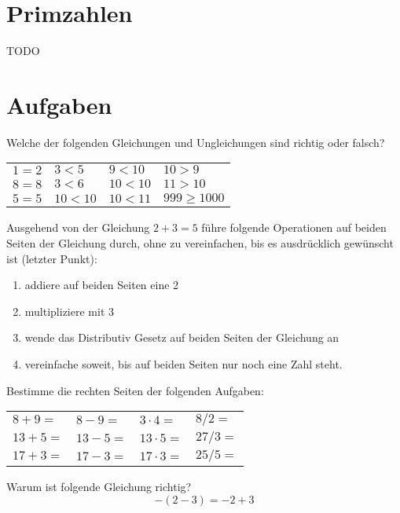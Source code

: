 \section{Primzahlen}

TODO

\section{Aufgaben}

\begin{prob}
\label{arith.1.1}

Welche der folgenden Gleichungen und Ungleichungen sind richtig oder falsch?
\begin{center}
\begin{tabular}{C{2cm}C{2cm}C{2cm}C{2cm}}
$1=2$ & $3<5$ & $9<10$ & $10>9$ \\
$8=8$ & $3<6$ & $10<10$ & $11>10$ \\
$5=5$ & $10<10$ & $10<11$ & $999 \ge 1000$ 
\end{tabular}
\end{center}
\end{prob}

\begin{prob}
\label{arith.1.2}
Ausgehend von der Gleichung $2+3=5$ führe folgende Operationen auf beiden Seiten der Gleichung durch, ohne zu vereinfachen, bis es ausdrücklich gewünscht ist (letzter Punkt):
\begin{enumerate}
\item addiere auf beiden Seiten eine 2
\item multipliziere mit 3
\item wende das Distributiv Gesetz auf beiden Seiten der Gleichung an
\item vereinfache soweit, bis auf beiden Seiten nur noch eine Zahl steht.
\end{enumerate}
\end{prob}

\begin{prob}
\label{arith.1.3}

Bestimme die rechten Seiten der folgenden Aufgaben:
\begin{center}
\begin{tabular}{C{2cm}C{2cm}C{2cm}C{2cm}}
$8+9=$ & $8-9=$ & $3\cdot 4=$ & ${8/ 2}=$ \\
$13+5=$ & $13-5=$ & $13\cdot 5=$ & ${27/ 3}=$ \\
$17+3=$ & $17-3=$ & $17 \cdot 3=$ & ${25/ 5}=$ 
\end{tabular}
\end{center}
\end{prob}

\begin{prob}
\label{arith.1.4}
Warum ist folgende Gleichung richtig?
\[ -(2-3) = -2+3 \]
\end{prob}
